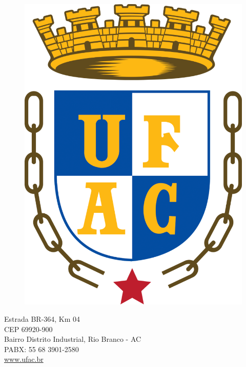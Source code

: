 \documentclass[aspectratio=43]{beamer} %
\begin{document}
\makeatother
{
\begin{frame}

	\begin{figure}
		\includegraphics[scale=0.1]{Imagens/logoUFAC.png}
	\end{figure}
	\begin{center}
		\begin{minipage}{0.77\textwidth}
			\small
			\begin{center}
			    Estrada BR-364, Km 04\\
			    CEP 69920-900\\
			    Bairro Distrito Industrial, Rio Branco - AC\\ 
				PABX: 55 68 3901-2580\\
				\url{www.ufac.br}
			\end{center}
		\end{minipage}
	\end{center}
\end{frame}
}
\end{document}
